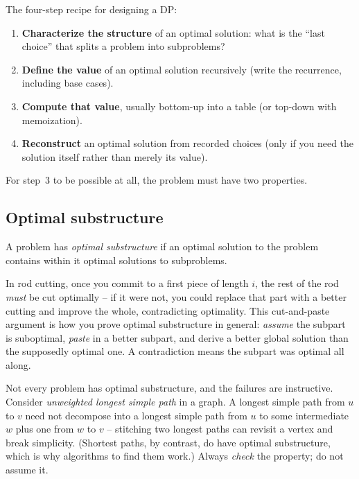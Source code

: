 \begin{focusbox}
The four-step recipe for designing a DP:
\begin{enumerate}
  \item \textbf{Characterize the structure} of an optimal solution: what is the
  ``last choice'' that splits a problem into subproblems?
  \item \textbf{Define the value} of an optimal solution recursively (write the
  recurrence, including base cases).
  \item \textbf{Compute that value}, usually bottom-up into a table (or
  top-down with memoization).
  \item \textbf{Reconstruct} an optimal solution from recorded choices (only if
  you need the solution itself rather than merely its value).
\end{enumerate}
\end{focusbox}

For step~3 to be possible at all, the problem must have two properties. 

\subsection{Optimal substructure}

\begin{definition}
\label{ch15:def-optsub}
A problem has \emph{optimal substructure} if an optimal solution to the problem
contains within it optimal solutions to subproblems.
\end{definition}

In rod cutting, once you commit to a first piece of length $i$, the rest of the
rod \emph{must} be cut optimally -- if it were not, you could replace that part
with a better cutting and improve the whole, contradicting optimality. This
cut-and-paste argument is how you prove optimal substructure in general:
\emph{assume} the subpart is suboptimal, \emph{paste} in a better subpart, and
derive a better global solution than the supposedly optimal one. A
contradiction means the subpart was optimal all along.

\begin{trapbox}
Not every problem has optimal substructure, and the failures are instructive.
Consider \emph{unweighted longest simple path} in a graph. A longest simple
path from $u$ to $v$ need not decompose into a longest simple path from $u$ to
some intermediate $w$ plus one from $w$ to $v$ -- stitching two longest paths
can revisit a vertex and break simplicity. (Shortest paths, by contrast, do
have optimal substructure, which is why algorithms to find them work.) Always
\emph{check} the property; do not assume it.
\end{trapbox}

